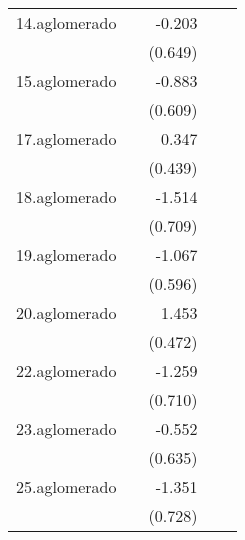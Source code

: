 {\begin{longtable}{l*{4}{D{.}{.}{-1}}}
\addlinespace
14.aglomerado&                     &      -0.203         &                     &                     \\
            &                     &     (0.649)         &                     &                     \\
\addlinespace
15.aglomerado&                     &      -0.883         &                     &                     \\
            &                     &     (0.609)         &                     &                     \\
\addlinespace
17.aglomerado&                     &       0.347         &                     &                     \\
            &                     &     (0.439)         &                     &                     \\
\addlinespace
18.aglomerado&                     &      -1.514\sym{*}  &                     &                     \\
            &                     &     (0.709)         &                     &                     \\
\addlinespace
19.aglomerado&                     &      -1.067         &                     &                     \\
            &                     &     (0.596)         &                     &                     \\
\addlinespace
20.aglomerado&                     &       1.453\sym{**} &                     &                     \\
            &                     &     (0.472)         &                     &                     \\
\addlinespace
22.aglomerado&                     &      -1.259         &                     &                     \\
            &                     &     (0.710)         &                     &                     \\
\addlinespace
23.aglomerado&                     &      -0.552         &                     &                     \\
            &                     &     (0.635)         &                     &                     \\
\addlinespace
25.aglomerado&                     &      -1.351         &                     &                     \\
            &                     &     (0.728)         &                     &                     \\

\end{longtable}}
